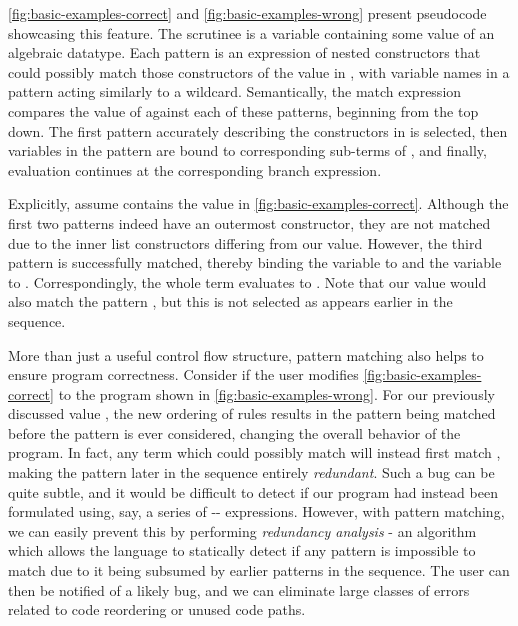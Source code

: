 \autoref{fig:basic-examples-correct} and \autoref{fig:basic-examples-wrong} present pseudocode showcasing this feature. The scrutinee is a variable  containing some value of an algebraic datatype. Each pattern is an expression of nested constructors that could possibly match those constructors of the value in , with variable names in a pattern acting similarly to a wildcard. Semantically, the match expression compares the value of  against each of these patterns, beginning from the top down. The first pattern accurately describing the constructors in  is selected, then variables in the pattern are bound to corresponding sub-terms of , and finally, evaluation continues at the corresponding branch expression. 

Explicitly, assume  contains the value  in \autoref{fig:basic-examples-correct}. Although the first two patterns indeed have an outermost  constructor, they are not matched due to the inner list constructors differing from our value. However, the third pattern  is successfully matched, thereby binding the variable  to  and the variable  to . Correspondingly, the whole term evaluates to . Note that our value would also match the pattern , but this is not selected as  appears earlier in the sequence.

More than just a useful control flow structure, pattern matching also helps to ensure program correctness. Consider if  the user modifies \autoref{fig:basic-examples-correct} to the program shown in \autoref{fig:basic-examples-wrong}. For our previously discussed value , the new ordering of rules results in the pattern  being matched before the pattern  is ever considered, changing the overall behavior of the program. In fact, any term which could possibly match  will instead first match , making the pattern later in the sequence entirely \emph{redundant}. Such a bug can be quite subtle, and it would be difficult to detect if our program had instead been formulated using, say, a series of -- expressions. However, with pattern matching, we can easily prevent this by performing \emph{redundancy analysis} -  an algorithm which allows the language to statically detect if any pattern is impossible to match due to it being subsumed by earlier patterns in the sequence. The user can then be notified of a likely bug, and we can eliminate large classes of errors related to code reordering or unused code paths.

